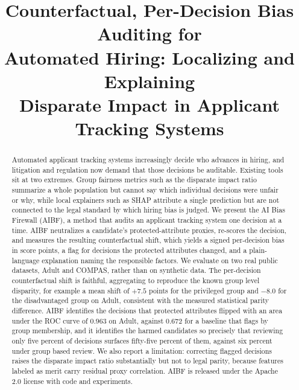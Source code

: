 \documentclass[conference]{IEEEtran}
\begin{document}
\title{Counterfactual, Per-Decision Bias Auditing for\\
Automated Hiring: Localizing and Explaining\\
Disparate Impact in Applicant Tracking Systems}

\author{
}

\maketitle

\begin{abstract}
Automated applicant tracking systems increasingly decide who advances in hiring,
and litigation and regulation now demand that those decisions be auditable.
Existing tools sit at two extremes. Group fairness metrics such as the disparate
impact ratio summarize a whole population but cannot say which individual decisions
were unfair or why, while local explainers such as SHAP attribute a single
prediction but are not connected to the legal standard by which hiring bias is
judged. We present the AI Bias Firewall (AIBF), a method that audits an applicant
tracking system one decision at a time. AIBF neutralizes a candidate's
protected-attribute proxies, re-scores the decision, and measures the resulting
counterfactual shift, which yields a signed per-decision bias in score points, a
flag for decisions the protected attributes changed, and a
plain-language explanation naming the responsible factors. We evaluate on two real
public datasets, Adult and COMPAS, rather than on synthetic data. The per-decision
counterfactual shift is faithful, aggregating to reproduce the known group level
disparity, for example a mean shift of $+7.5$ points for the privileged group and
$-8.0$ for the disadvantaged group on Adult, consistent with the measured
statistical parity difference. AIBF identifies the decisions that protected
attributes flipped with an area under the ROC curve of $0.963$ on Adult, against
$0.672$ for a baseline that flags by group membership, and it identifies the
harmed candidates so precisely that reviewing only five percent of decisions
surfaces fifty-five percent of them, against six percent under group based review.
We also report a limitation: correcting flagged decisions raises the
disparate impact ratio substantially but not to legal parity, because features
labeled as merit carry residual proxy correlation. AIBF is released under the
Apache 2.0 license with code and experiments.
\end{abstract}
\end{document}
